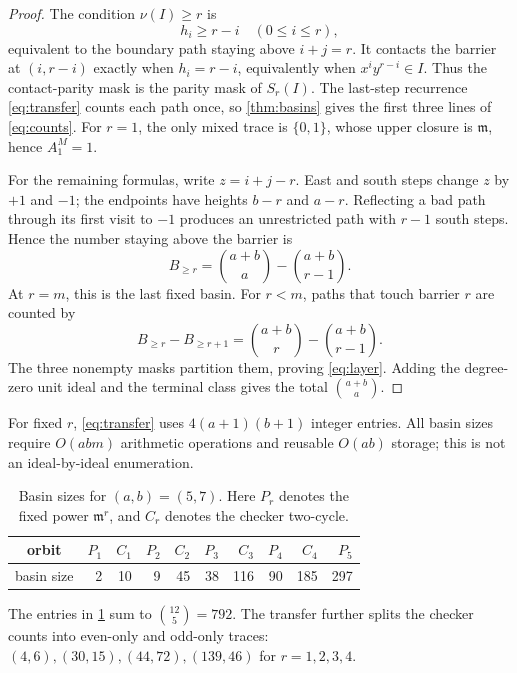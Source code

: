 \documentclass[10pt,a4paper]{amsart}
\theoremstyle{definition}
\theoremstyle{remark}
\newcommand{\mm}{\mathfrak m}
\begin{document}
\begin{proof}
The condition \(\nu(I)\geq r\) is
\[
                         h_i\geq r-i\quad(0\leq i\leq r), \tag{5.7}
\]
equivalent to the boundary path staying above \(i+j=r\).  It contacts the
barrier at \((i,r-i)\) exactly when \(h_i=r-i\), equivalently when
\(x^iy^{r-i}\in I\).  Thus the contact-parity mask is the parity mask of
\(S_r(I)\).  The last-step recurrence \eqref{eq:transfer} counts each path
once, so \cref{thm:basins} gives the first three lines of
\eqref{eq:counts}.  For \(r=1\), the only mixed trace is \(\{0,1\}\), whose
upper closure is \(\mm\), hence \(A_1^M=1\).

For the remaining formulas, write \(z=i+j-r\).  East and south steps change
\(z\) by \(+1\) and \(-1\); the endpoints have heights \(b-r\) and \(a-r\).
Reflecting a bad path through its first visit to \(-1\) produces an
unrestricted path with \(r-1\) south steps.  Hence the number staying above
the barrier is
\[
B_{\geq r}=\binom{a+b}{a}-\binom{a+b}{r-1}.               \tag{5.8}
\]
At \(r=m\), this is the last fixed basin.  For \(r<m\), paths that touch
barrier \(r\) are counted by
\[
B_{\geq r}-B_{\geq r+1}
=\binom{a+b}{r}-\binom{a+b}{r-1}.
\]
The three nonempty masks partition them, proving \eqref{eq:layer}.  Adding
the degree-zero unit ideal and the terminal class gives the total
\(\binom{a+b}{a}\).
\end{proof}

For fixed \(r\), \eqref{eq:transfer} uses \(4(a+1)(b+1)\) integer entries.
All basin sizes require \(O(abm)\) arithmetic operations and reusable
\(O(ab)\) storage; this is not an ideal-by-ideal enumeration.

\begin{table}[t]
\centering
\caption{Basin sizes for \((a,b)=(5,7)\).  Here \(P_r\) denotes the fixed
power \(\mm^r\), and \(C_r\) denotes the checker two-cycle.}
\label{tab:example}
\begin{tabular}{c@{\quad}rrrrrrrrr}
\toprule
orbit&\(P_1\)&\(C_1\)&\(P_2\)&\(C_2\)&\(P_3\)&\(C_3\)&\(P_4\)&\(C_4\)&\(P_5\)\\
\midrule
basin size&2&10&9&45&38&116&90&185&297\\
\bottomrule
\end{tabular}
\end{table}

The entries in \cref{tab:example} sum to
\(\binom{12}{5}=792\).  The transfer further splits the checker counts into
even-only and odd-only traces:
\((4,6),(30,15),(44,72),(139,46)\) for \(r=1,2,3,4\).
\end{document}
